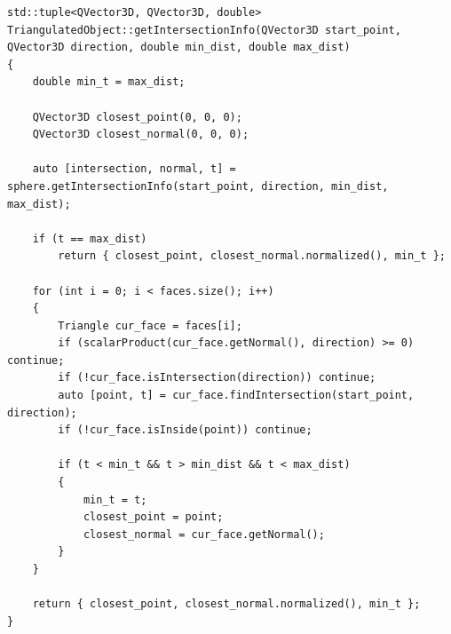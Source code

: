 \begin{center}
\captionsetup{justification=raggedright,singlelinecheck=off}
\begin{lstlisting}[label=lst:tr,caption=Поиск пересечения луча с триангулированным объектом,basicstyle=\ttfamily\footnotesize]
std::tuple<QVector3D, QVector3D, double> TriangulatedObject::getIntersectionInfo(QVector3D start_point, QVector3D direction, double min_dist, double max_dist)
{
    double min_t = max_dist;

    QVector3D closest_point(0, 0, 0);
    QVector3D closest_normal(0, 0, 0);

    auto [intersection, normal, t] = sphere.getIntersectionInfo(start_point, direction, min_dist, max_dist);

    if (t == max_dist)
        return { closest_point, closest_normal.normalized(), min_t };

    for (int i = 0; i < faces.size(); i++)
    {
        Triangle cur_face = faces[i];
        if (scalarProduct(cur_face.getNormal(), direction) >= 0) continue;
        if (!cur_face.isIntersection(direction)) continue;
        auto [point, t] = cur_face.findIntersection(start_point, direction);
        if (!cur_face.isInside(point)) continue;

        if (t < min_t && t > min_dist && t < max_dist)
        {
            min_t = t;
            closest_point = point;
            closest_normal = cur_face.getNormal();
        }
    }

    return { closest_point, closest_normal.normalized(), min_t };
}
\end{lstlisting}
\end{center}

\clearpage


